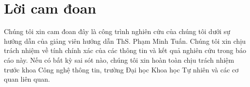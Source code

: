 \chapter*{Lời cam đoan}
\label{commitment}
Chúng tôi xin cam đoan đây là công trình nghiên cứu của chúng tôi dưới sự hướng dẫn của giảng viên hướng dẫn ThS. Phạm Minh Tuấn. Chúng tôi xin chịu trách nhiệm về tính chính xác của các thông tin và kết quả nghiên cứu trong báo cáo này. Nếu có bất kỳ sai sót nào, chúng tôi xin hoàn toàn chịu trách nhiệm trước khoa Công nghệ thông tin, trường Đại học Khoa học Tự nhiên và các cơ quan liên quan.
